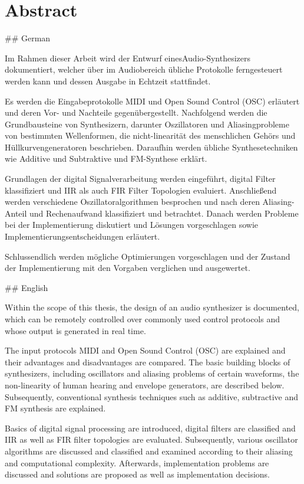\chapter*{Abstract}\label{abstract}

## German

Im Rahmen dieser Arbeit wird der Entwurf einesAudio-Synthesizers dokumentiert, welcher über im Audiobereich übliche Protokolle ferngesteuert werden kann und dessen Ausgabe in Echtzeit stattfindet.

Es werden die Eingabeprotokolle MIDI und Open Sound Control (OSC) erläutert und deren Vor- und Nachteile gegenübergestellt.
Nachfolgend werden die Grundbausteine von Synthesizern, darunter Oszillatoren und Aliasingprobleme von bestimmten Wellenformen, die nicht-linearität des menschlichen Gehörs und Hüllkurvengeneratoren beschrieben.
Daraufhin werden übliche Synthesetechniken wie Additive und Subtraktive und FM-Synthese erklärt.

Grundlagen der digital Signalverarbeitung werden eingeführt, digital Filter klassifiziert und IIR als auch FIR Filter Topologien evaluiert.
Anschließend werden verschiedene Oszillatoralgorithmen besprochen und nach deren Aliasing-Anteil und Rechenaufwand klassifiziert und betrachtet.
Danach werden Probleme bei der Implementierung diskutiert und Lösungen vorgeschlagen sowie Implementierungsentscheidungen erläutert.

Schlussendlich werden mögliche Optimierungen vorgeschlagen und der Zustand der Implementierung mit den Vorgaben verglichen und ausgewertet.

## English

Within the scope of this thesis, the design of an audio synthesizer is documented, which can be remotely controlled over commonly used control protocols and whose output is generated in real time.

The input protocols MIDI and Open Sound Control (OSC) are explained and their advantages and disadvantages are compared.
The basic building blocks of synthesizers, including oscillators and aliasing problems of certain waveforms, the non-linearity of human hearing and envelope generators, are described below.
Subsequently, conventional synthesis techniques such as additive, subtractive and FM synthesis are explained.

Basics of digital signal processing are introduced, digital filters are classified and IIR as well as FIR filter topologies are evaluated.
Subsequently, various oscillator algorithms are discussed and classified and examined according to their aliasing and computational complexity.
Afterwards, implementation problems are discussed and solutions are proposed as well as implementation decisions.

